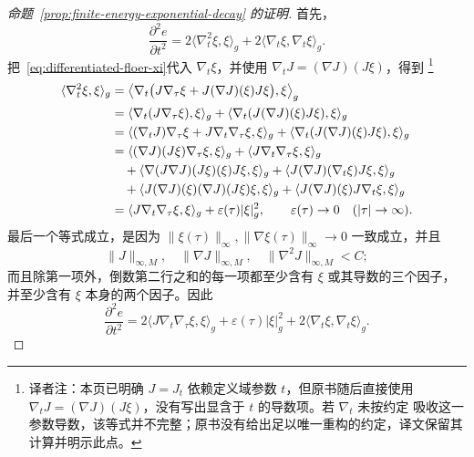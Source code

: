 \begin{proof}[命题~\ref{prop:finite-energy-exponential-decay} 的证明]
首先，
\[
  \frac{\partial^2e}{\partial t^2}
  =2\langle\nabla_t^2\xi,\xi\rangle_g
   +2\langle\nabla_t\xi,\nabla_t\xi\rangle_g.
\]
把~\eqref{eq:differentiated-floer-xi}代入 $\nabla_t\xi$，并使用
$\nabla_tJ=(\nabla J)(J\xi)$，得到
\footnote{译者注：本页已明确 $J=J_t$ 依赖定义域参数 $t$，但原书随后直接使用
$\nabla_tJ=(\nabla J)(J\xi)$，没有写出显含于 $t$ 的导数项。若 $\nabla_t$ 未按约定
吸收这一参数导数，该等式并不完整；原书没有给出足以唯一重构的约定，译文保留其
计算并明示此点。}
\begin{align}
  \langle\nabla_t^2\xi,\xi\rangle_g
  &=\left\langle
      \nabla_t\bigl(J\nabla_\tau\xi
        +J(\nabla J)(\xi)J\xi\bigr),\xi
    \right\rangle_g \notag\\
  &=\langle\nabla_t(J\nabla_\tau\xi),\xi\rangle_g
    +\langle\nabla_t(J(\nabla J)(\xi)J\xi),\xi\rangle_g \notag\\
  &=\langle(\nabla_tJ)\nabla_\tau\xi
      +J\nabla_t\nabla_\tau\xi,\xi\rangle_g
    +\langle\nabla_t(J(\nabla J)(\xi)J\xi),\xi\rangle_g \notag\\
  &=\langle(\nabla J)(J\xi)\nabla_\tau\xi,\xi\rangle_g
    +\langle J\nabla_t\nabla_\tau\xi,\xi\rangle_g \notag\\
  &\quad
    +\langle\nabla(J\nabla J)(J\xi)(\xi)J\xi,\xi\rangle_g
    +\langle J(\nabla J)(\nabla_t\xi)J\xi,\xi\rangle_g \notag\\
  &\quad
    +\langle J(\nabla J)(\xi)(\nabla J)(J\xi)\xi,\xi\rangle_g
    +\langle J(\nabla J)(\xi)J\nabla_t\xi,\xi\rangle_g \notag\\
  &=\langle J\nabla_t\nabla_\tau\xi,\xi\rangle_g
    +\varepsilon(\tau)|\xi|_g^2,
  \qquad
  \varepsilon(\tau)\to0\quad(|\tau|\to\infty).
\label{eq:second-t-derivative-pairing}
\end{align}
最后一个等式成立，是因为
$\|\xi(\tau)\|_\infty,\|\nabla\xi(\tau)\|_\infty\to0$ 一致成立，并且
\[
  \|J\|_{\infty,M},
  \quad
  \|\nabla J\|_{\infty,M},
  \quad
  \|\nabla^2J\|_{\infty,M}
  <C;
\]
而且除第一项外，倒数第二行之和的每一项都至少含有 $\xi$ 或其导数的三个因子，
并至少含有 $\xi$ 本身的两个因子。因此
\begin{equation}
  \frac{\partial^2e}{\partial t^2}
  =2\langle J\nabla_t\nabla_\tau\xi,\xi\rangle_g
   +\varepsilon(\tau)|\xi|_g^2
   +2\langle\nabla_t\xi,\nabla_t\xi\rangle_g.
\label{eq:t-second-energy-density}
\end{equation}


\end{proof}
